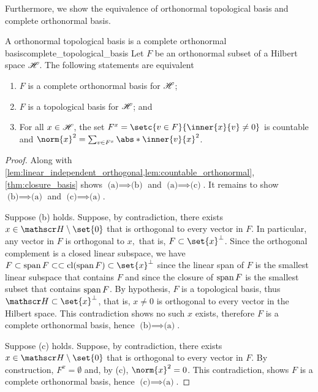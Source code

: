 Furthermore, we show the equivalence of orthonormal topological basis and complete orthonormal basis.
    \begin{theorem}{A orthonormal topological basis is a complete orthonormal basis}{complete_topological_basis}
    Let \(F\) be an orthonormal subset of a Hilbert space \(\mathscr{H}\). The following statements are equivalent
    \begin{enumerate}[label=(\alph*)]
        \item \(F\) is a complete orthonormal basis for \(\mathscr{H}\);
        \item \(F\) is a topological basis for \(\mathscr{H}\); and
        \item For all \(x \in \mathscr{H}\), the set \(F^x = \setc{v \in F}{\inner{x}{v} \neq 0}\) is countable and \(\norm{x}^2 = \sum_{v \in F^x} \abs*{\inner{v}{x}}^2\).
    \end{enumerate}
\end{theorem}
\begin{proof}
    Along with \cref{lem:linear_independent_orthogonal,lem:countable_orthonormal}, \cref{thm:closure_basis} shows \(\text{(a)} \implies \text{(b)}\) and \(\text{(a)}\implies \text{(c)}\). It remains to show \(\text{(b)}\implies \text{(a)}\) and \(\text{(c)}\implies \text{(a)}\).

    Suppose (b) holds. Suppose, by contradiction, there exists \(x \in \hilbert\setminus \set{0}\) that is orthogonal to every vector in \(F\). In particular, any vector in \(F\) is orthogonal to \(x,\) that is, \(F \subset \set{x}^\perp\). Since the orthogonal complement is a closed linear subspace, we have \(F \subset \lspan F \subset \subset \cl(\lspan F) \subset \set{x}^\perp\) since the linear span of \(F\) is the smallest linear subspace that contains \(F\) and since the closure of \(\operatorname{span} F\) is the smallest subset that contains \(\operatorname{span} F\). By hypothesis, \(F\) is a topological basis, thus \(\hilbert \subset \set{x}^\perp\), that is, \(x \neq 0\) is orthogonal to every vector in the Hilbert space. This contradiction shows no such \(x\) exists, therefore \(F\) is a complete orthonormal basis, hence \(\text{(b)}\implies \text{(a)}\).

    Suppose (c) holds. Suppose, by contradiction, there exists \(x \in \hilbert\setminus\set{0}\) that is orthogonal to every vector in \(F\). By construction, \(F^x = \emptyset\) and, by (c), \(\norm{x}^2 = 0\). This contradiction, shows \(F\) is a complete orthonormal basis, hence \(\text{(c)}\implies \text{(a)}\).
\end{proof}
